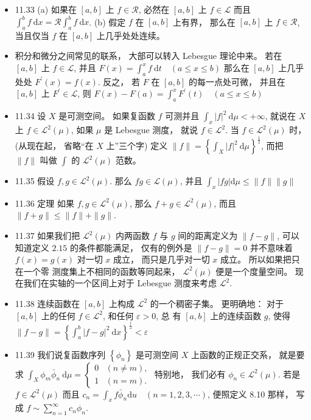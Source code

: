 \begin{itemize}
\item 11.33 (a) 如果在 $[a, b]$ 上 $f \in\mathscr{R}$, 必然在 $[a, b]$ 上 $f \in \mathscr{L}$ 而且 $\int_{a}^{b} f \mathrm{~d} x=\mathscr{R} \int_{a}^{b} f \mathrm{~d} x$. (b) 假定 $f$ 在 $[a , b]$ 上有界， 那么在 $[a,b]$ 上 $f \in \mathscr{R}$, 当且仅当 $f$ 在 $[a, b]$ 上几乎处处连续。

\item 积分和微分之间常见的联系， 大部可以转入 Lebesgue 理论中来。 若在 $[a, b]$ 上 $f \in \mathscr{L}$, 并且 $F(x)=\int_{a}^{x} f \mathrm{~d} t \quad(a \leqslant x \leqslant b)$ 那么在 $[a, b]$ 上几乎处处 $F^{\prime}(x)=f(x)$. 反之， 若 $F$ 在 $[a, b]$ 的每一点处可微， 并且在 $[a, b]$ 上 $F^{\prime} \in \mathscr{L}$, 则 $F(x)-F(a)=\int_{a}^{x} F^{\prime}(t) \quad(a \leqslant x \leqslant b)$

\item 11.34 设 $X$ 是可测空间。 如果复函数 $f$ 可测并且 $\int_{x}|f|^{2} \mathrm{~d} \mu<+\infty$, 就说在 $X$ 上 $f \in \mathscr{L}^{2}(\mu)$, 如果 $\mu$ 是 Lebesgue 测度， 就说 $f \in \mathscr{L}^{2}$. 当 $f \in \mathscr{L}^{2}(\mu)$ 时， (从现在起， 省略“在 $X$ 上”三个字) 定义 $\|f\|=\left\{\int_{X}|f|^{2} \mathrm{~d} \mu\right\}^{\frac{1}{2}}$, 而把 $\|f\|$ 叫做 $\int$ 的 $\mathscr{L}^{2}(\mu)$ 范数。

\item 11.35 假设 $f, g \in \mathscr{L}^{2}(\mu)$. 那么 $f g \in \mathscr{L}(\mu)$, 并且 $\int_{x}|f g| \mathrm{d} \mu \leqslant\|f\|\|g\|$

\item 11.36 定理 如果 $f, g \in \mathscr{L}^{2}(\mu)$, 那么 $f+g \in \mathscr{L}^{2}(\mu)$, 而且 $\|f+g\| \leqslant\|f\|+\|g\|$.

\item 11.37 如果我们把 $\mathscr{L}^{2}(\mu)$ 内两函数 $f$ 与 $g$ 间的距离定义为 $\|f-g\|$, 可以知道定义 $2.15$ 的条件都能满足， 仅有的例外是 $\|f-g\|=0$ 并不意味着 $f(x)=g(x)$ 对一切 $x$ 成立， 而只是几乎对一切 $x$ 成立。 所以如果把只在一个零 测度集上不相同的函数等同起来， $\mathscr{L}^{2}(\mu)$ 便是一个度量空间。 现在我们在实轴的一个区间上对于 Lebesgue 测度来考虑 $\mathscr{L}^{2}$.

\item 11.38 连续函数在 $[a, b]$ 上构成 $\mathscr{L}^{2}$ 的一个稠密子集。 更明确地： 对于 $[a, b]$ 上的任何 $f \in \mathscr{L}^{2}$, 和任何 $\varepsilon>0$, 总 有 $[a, b]$ 上的连续函数 $g$, 使得 $\|f-g\|=\left\{\int_{a}^{b}|f-g|^{2} \mathrm{~d} x\right\}^{\frac{1}{2}}<\varepsilon$

\item 11.39 我们说复函数序列 $\left\{\phi_{n}\right\}$ 是可测空间 $X$ 上函数的正规正交系， 就是要求 $\int_{X} \phi_{m} \bar{\phi}_{n} \mathrm{~d} \mu= \begin{cases}0 & (n \neq m), \\ 1 & (n=m) .\end{cases}$ 特别地， 我们必有 $\phi_{n} \in \mathscr{L}^{2}(\mu)$. 若是 $f \in \mathscr{L}^{2}(\mu)$ 而且 $c_{n}=\int_{x} f \bar{\phi}_{n}\mathrm{d}u \quad(n=1,2,3, \cdots)$, 便照定义 8.10 那样， 写成 $f \sim \sum_{n=1}^{\infty} c_{n} \phi_{n}$.


\end{itemize}
